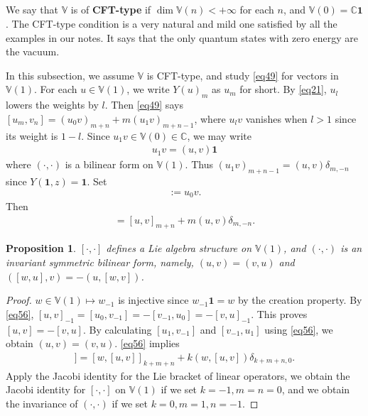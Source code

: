 \documentclass[12pt,a4paper,notitlepage]{article}
\theoremstyle{definition}
\theoremstyle{plain}
\newtheorem{pp}[df]{Proposition}
\newcommand{\id}{\mathbf{1}}
\newcommand{\prth}[1]{( {#1})}
\newcommand{\Vbb}{\mathbb V}
\newcommand{\Cbb}{\mathbb C}
\numberwithin{equation}{section}
\begin{document}
\subsection{}\label{lb56}
We say that $\Vbb$ is of \textbf{CFT-type} if $\dim\Vbb(n)<+\infty$ for each $n$, and $\Vbb(0)=\Cbb\id$. The CFT-type condition is a very natural and mild one satisfied by all the examples in our notes. It says that the only quantum states with zero energy are the vacuum.


In this subsection, we assume $\Vbb$ is CFT-type, and study \eqref{eq49} for vectors in $\Vbb(1)$. For each $u\in\Vbb(1)$, we write $Y(u)_m$ as $u_m$ for short. By \eqref{eq21}, $u_l$ lowers the weights by $l$. Then \eqref{eq49} says $[u_m,v_n]=(u_0v)_{m+n}+m(u_1v)_{m+n-1}$, where $u_lv$ vanishes when $l>1$ since its weight is $1-l$. Since $u_1v\in\Vbb(0)\in\Cbb$, we may write
\begin{align}
u_1v=\prth{u,v}\id	\label{eq58}
\end{align}
where $\prth{\cdot,\cdot}$ is a bilinear form on $\Vbb(1)$. Thus $(u_1v)_{m+n-1}=\prth{u,v}\delta_{m,-n}$ since $Y(\id,z)=\id$. Set
\begin{align}
[u,v]:=u_0v.	\label{eq55}
\end{align}
Then
\begin{align}
[u_m,v_n]=[u,v]_{m+n}+m\prth{u,v}\delta_{m,-n}.	\label{eq56}
\end{align}



\begin{pp}
$[\cdot,\cdot]$ defines a Lie algebra structure on $\Vbb(1)$, and $\prth{\cdot,\cdot}$ is an invariant symmetric bilinear form, namely, $\prth{u,v}=\prth{v,u}$ and $\prth{[w,u],v}=-\prth{u,[w,v]}$.
\end{pp}

\begin{proof}
$w\in\Vbb(1)\mapsto w_{-1}$ is injective since $w_{-1}\id=w$  by the creation property. By \eqref{eq56}, $[u,v]_{-1}=[u_0,v_{-1}]=-[v_{-1},u_0]=-[v,u]_{-1}$. This proves $[u,v]=-[v,u]$. By calculating $[u_1,v_{-1}]$ and $[v_{-1},u_1]$ using \eqref{eq56}, we obtain $\prth{u,v}=\prth{v,u}$. \eqref{eq56} implies 
\begin{align*}
[w_k,[u_m,v_n]]=[w,[u,v]]_{k+m+n}+k\prth{w,[u,v]}\delta_{k+m+n,0}.	
\end{align*}
Apply the Jacobi identity for the Lie bracket of linear operators, we obtain the Jacobi identity for $[\cdot,\cdot]$ on $\Vbb(1)$ if we set $k=-1,m=n=0$, and we obtain the invariance of $\prth{\cdot,\cdot}$ if we set $k=0,m=1,n=-1$.
\end{proof}
\end{document}
